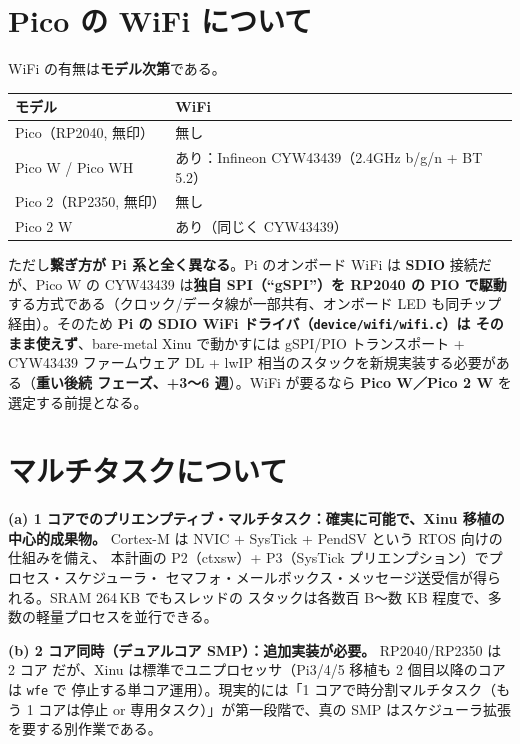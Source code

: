 \documentclass[a4paper,11pt]{ltjsarticle}
\begin{document}
\section{Pico の WiFi について}
\label{sec:picowifi}
WiFi の有無は\textbf{モデル次第}である。

\begin{center}\small
\begin{tabular}{@{}ll@{}}
\toprule
モデル & WiFi\\
\midrule
Pico（RP2040, 無印） & 無し\\
Pico W / Pico WH & あり：Infineon CYW43439（2.4GHz b/g/n + BT 5.2）\\
Pico 2（RP2350, 無印） & 無し\\
Pico 2 W & あり（同じく CYW43439）\\
\bottomrule
\end{tabular}
\end{center}

\noindent ただし\textbf{繋ぎ方が Pi 系と全く異なる}。Pi のオンボード WiFi は
\textbf{SDIO} 接続だが、Pico W の CYW43439 は\textbf{独自 SPI（``gSPI''）を RP2040 の
PIO で駆動}する方式である（クロック/データ線が一部共有、オンボード LED も同チップ
経由）。そのため \textbf{Pi の SDIO WiFi ドライバ（\texttt{device/wifi/wifi.c}）は
そのまま使えず}、bare-metal Xinu で動かすには gSPI/PIO トランスポート + CYW43439
ファームウェア DL + lwIP 相当のスタックを新規実装する必要がある（\textbf{重い後続
フェーズ、+3〜6 週}）。WiFi が要るなら \textbf{Pico W／Pico 2 W} を選定する前提となる。

\section{マルチタスクについて}
\textbf{(a) 1 コアでのプリエンプティブ・マルチタスク：確実に可能で、Xinu 移植の
中心的成果物。} Cortex-M は NVIC + SysTick + PendSV という RTOS 向けの仕組みを備え、
本計画の P2（ctxsw）+ P3（SysTick プリエンプション）でプロセス・スケジューラ・
セマフォ・メールボックス・メッセージ送受信が得られる。SRAM 264\,KB でもスレッドの
スタックは各数百 B〜数 KB 程度で、多数の軽量プロセスを並行できる。

\textbf{(b) 2 コア同時（デュアルコア SMP）：追加実装が必要。} RP2040/RP2350 は 2 コア
だが、Xinu は標準でユニプロセッサ（Pi3/4/5 移植も 2 個目以降のコアは \texttt{wfe} で
停止する単コア運用）。現実的には「1 コアで時分割マルチタスク（もう 1 コアは停止 or
専用タスク）」が第一段階で、真の SMP はスケジューラ拡張を要する別作業である。
\end{document}
